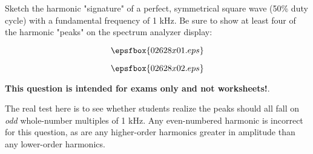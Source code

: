 

Sketch the harmonic "signature" of a perfect, symmetrical square wave (50\% duty cycle) with a fundamental frequency of 1 kHz.  Be sure to show at least four of the harmonic "peaks" on the spectrum analyzer display:

$$\epsfbox{02628x01.eps}$$







$$\epsfbox{02628x02.eps}$$







{\bf This question is intended for exams only and not worksheets!}.

The real test here is to see whether students realize the peaks should all fall on {\it odd} whole-number multiples of 1 kHz.  Any even-numbered harmonic is incorrect for this question, as are any higher-order harmonics greater in amplitude than any lower-order harmonics.




